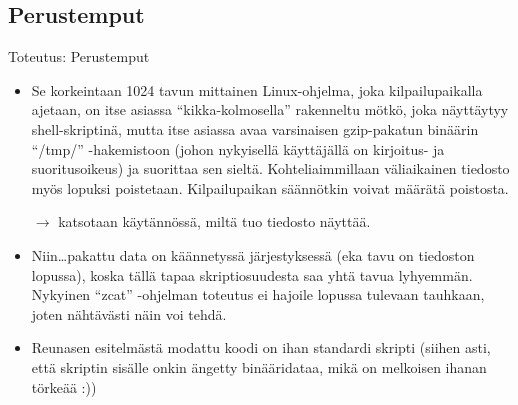 \documentclass[pdf,10pt,handout]{beamer}
\begin{document}
\subsection{Perustemput}
\begin{frame}{Toteutus: Perustemput}
  \begin{itemize}
    \item Se korkeintaan 1024 tavun mittainen Linux-ohjelma, joka
      kilpailupaikalla ajetaan, on itse asiassa ``kikka-kolmosella''
      rakenneltu mötkö, joka näyttäytyy shell-skriptinä, mutta itse
      asiassa avaa varsinaisen gzip-pakatun binäärin ``/tmp/''
      -hakemistoon (johon nykyisellä käyttäjällä on kirjoitus- ja
      suoritusoikeus) ja suorittaa sen sieltä. Kohteliaimmillaan
      väliaikainen tiedosto myös lopuksi poistetaan. Kilpailupaikan
      säännötkin voivat määrätä poistosta.
    \item[$\rightarrow$] katsotaan käytännössä, miltä tuo tiedosto
      näyttää.
    \item Niin\ldots pakattu data on käännetyssä järjestyksessä (eka
      tavu on tiedoston lopussa), koska tällä tapaa skriptiosuudesta
      saa yhtä tavua lyhyemmän. Nykyinen ``zcat'' -ohjelman toteutus
      ei hajoile lopussa tulevaan tauhkaan, joten nähtävästi näin voi
      tehdä.
    \item Reunasen esitelmästä modattu koodi on ihan standardi skripti
      (siihen asti, että skriptin sisälle onkin ängetty binääridataa,
      mikä on melkoisen ihanan törkeää :))
  \end{itemize}
\end{frame}
\end{document}
